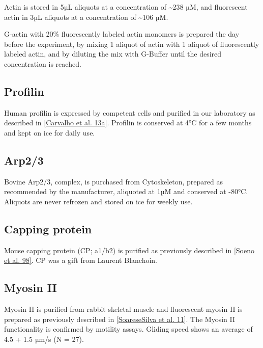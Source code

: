 \documentclass[A4paperpaper,11pt,english]{sphinxmanual}
\begin{document}
Actin is stored in 5µL aliquots at a concentration of \textasciitilde{}238 µM, and
fluorescent actin in 3µL aliquots at a concentration of \textasciitilde{}106 µM.

G-actin with 20\% fluorescently labeled actin monomers is prepared the day before
the experiment, by mixing 1 aliquot of actin with 1 aliquot of fluorescently
labeled actin, and by diluting the mix with G-Buffer until the desired concentration is reached.


\subsection{Profilin}
\label{index-latex:profilin}
Human profilin is expressed by competent cells and purified in our laboratory as
described in {\hyperref[index-latex:carvalho2013a]{{[}Carvalho et al. 13a{]}}}.  Profilin is conserved at 4°C for a few months and
kept on ice for daily use.


\subsection{Arp2/3}
\label{index-latex:arp2-3}
Bovine Arp2/3, complex, is purchased from Cytoskeleton, prepared as recommended by the manufacturer, aliquoted at 1µM
and conserved at -80°C.  Aliquots are never refrozen and stored on ice for
weekly use.


\subsection{Capping protein}
\label{index-latex:capping-protein}
Mouse capping protein (CP; a1/b2) is purified as previously described in {\hyperref[index-latex:soeno1998]{{[}Soeno et al. 98{]}}}. CP was a gift from Laurent Blanchoin.


\subsection{Myosin II}
\label{index-latex:myosin-ii}
Myosin II is purified from rabbit skeletal muscle and fluorescent myosin II is
prepared as previously described in {\hyperref[index-latex:soaresesilva2011]{{[}SoareseSilva et al. 11{]}}}. The Myosin II functionality
is confirmed by motility assays. Gliding speed shows an average of 4.5
+ 1.5 µm/s (N = 27).
\end{document}
